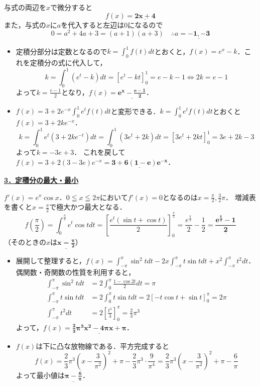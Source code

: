 \documentclass[a4paper,11pt]{ltjsarticle}
\begin{document}
\begin{ans}
与式の両辺を$x$で微分すると
\[f(x)=\underline{\boldsymbol{2x+4}}\]
また，与式の$x$に$a$を代入すると左辺は0になるので
\[0=a^2+4a+3=(a+1)(a+3) \quad \therefore a=\underline{\boldsymbol{-1,-3}}\]
\end{ans}

\begin{ans}
    \begin{itemize}
        \item [(1)]定積分部分は定数となるので$k=\int_0^1 f(t)dt$とおくと，$f(x)=e^x-k$．これを定積分の式に代入して，
        \[k=\int_0^1(e^t-k)dt=[e^t-kt]_0^1=e-k-1 \iff 2k=e-1\]
        よって$k=\frac{e-1}{2}$となり，$f(x)=\underline{\boldsymbol{e^x-\frac{e-1}{2}}}$．
        \item [(2)]$f(x)=3+2e^{-x}\int_0^1e^tf(t)dt$と変形できる．$k=\int_0^1e^tf(t)dt$とおくと$f(x)=3+2ke^{-x}$．
        \[k=\int_0^1e^t(3+2ke^{-t})dt=\int_0^1(3e^t+2k)dt=[3e^t+2kt]_0^1=3e+2k-3\]
        よって$k=-3e+3$．
        これを戻して$f(x)=3+2(3-3e)e^{-x}=\underline{\boldsymbol{3+6(1-e)e^{-x}}}$．
    \end{itemize}
\end{ans}
\noindent \underline{{\large{\textbf{3．定積分の最大・最小}}}}
\begin{ans}
$f'(x)=e^x\cos x$．$0\leqq x\leqq 2\pi$において$f'(x)=0$となるのは$x=\frac{\pi}{2}, \frac{3}{2}\pi$．
増減表を書くと$x=\frac{\pi}{2}$で極大かつ最大となる．
\[f\left(\frac{\pi}{2}\right)=\int_0^{\frac\pi2}e^t\cos tdt=\left[\frac{e^t(\sin t+\cos t)}{2}\right]_0^{\frac\pi2}=\frac{e^{\frac\pi2}}{2}-\frac{1}{2}=\underline{\boldsymbol{\frac{e^{\frac\pi2}-1}{2}}}\]
（そのときの$x$は$\underline{\boldsymbol{x=\frac{\pi}{2}}}$）
\end{ans}
\begin{ans}
\begin{itemize}
    \item [(1)]展開して整理すると，$f(x)=\int_{-\pi}^\pi \sin^2 tdt -2x\int_{-\pi}^\pi t\sin tdt +x^2\int_{-\pi}^\pi t^2dt$．
    偶関数・奇関数の性質を利用すると，
    \begin{align*}
        \int_{-\pi}^\pi \sin^2 tdt &= 2\int_0^\pi \frac{1-\cos 2t}{2}dt = \pi\\
        \int_{-\pi}^\pi t\sin tdt &= 2\int_0^\pi t\sin tdt = 2[-t\cos t+\sin t]_0^\pi = 2\pi\\
        \int_{-\pi}^\pi t^2dt &= 2\left[\frac{t^3}{3}\right]_0^\pi = \frac{2}{3}\pi^3
    \end{align*}
    よって，$f(x)=\underline{\boldsymbol{\frac{2}{3}\pi^3 x^2 -4\pi x +\pi}}$．
    \item [(2)]$f(x)$は下に凸な放物線である．平方完成すると
    \[f(x)=\frac{2}{3}\pi^3\left(x-\frac{3}{\pi^2}\right)^2+\pi-\frac{2}{3}\pi^3\cdot\frac{9}{\pi^4}=\frac{2}{3}\pi^3\left(x-\frac{3}{\pi^2}\right)^2+\pi-\frac{6}{\pi}\]
    よって最小値は$\underline{\boldsymbol{\pi-\frac{6}{\pi}}}$．
\end{itemize}
\end{ans}
\end{document}
